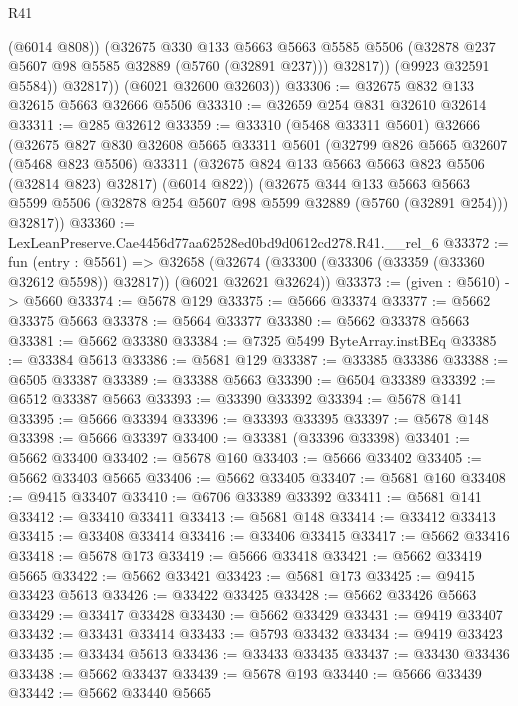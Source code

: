 \begin{lexlean}{R41}
\begin{coremodule}
                (@6014 @808))
              (@32675
                @330
                @133
                @5663
                @5663
                @5585
                @5506
                (@32878 @237 @5607 @98 @5585 @32889 (@5760 (@32891 @237)))
                @32817))
            (@9923 @32591 @5584))
          @32817))
      (@6021 @32600 @32603))
@33306 := @32675 @832 @133 @32615 @5663 @32666 @5506
@33310 := @32659 @254 @831 @32610 @32614
@33311 := @285 @32612
@33359 := @33310
    (@5468 @33311 @5601)
    @32666
    (@32675
      @827
      @830
      @32608
      @5665
      @33311
      @5601
      (@32799
        @826
        @5665
        @32607
        (@5468 @823 @5506)
        @33311
        (@32675 @824 @133 @5663 @5663 @823 @5506 (@32814 @823) @32817)
        (@6014 @822))
      (@32675
        @344
        @133
        @5663
        @5663
        @5599
        @5506
        (@32878 @254 @5607 @98 @5599 @32889 (@5760 (@32891 @254)))
        @32817))
@33360 := LexLeanPreserve.Cae4456d77aa62528ed0bd9d0612cd278.R41.__rel_6
@33372 := fun (entry : @5561) =>
  @32658 (@32674 (@33300 (@33306 (@33359 (@33360 @32612 @5598)) @32817)) (@6021 @32621 @32624))
@33373 := (given : @5610) -> @5660
@33374 := @5678 @129
@33375 := @5666 @33374
@33377 := @5662 @33375 @5663
@33378 := @5664 @33377
@33380 := @5662 @33378 @5663
@33381 := @5662 @33380
@33384 := @7325 @5499 ByteArray.instBEq
@33385 := @33384 @5613
@33386 := @5681 @129
@33387 := @33385 @33386
@33388 := @6505 @33387
@33389 := @33388 @5663
@33390 := @6504 @33389
@33392 := @6512 @33387 @5663
@33393 := @33390 @33392
@33394 := @5678 @141
@33395 := @5666 @33394
@33396 := @33393 @33395
@33397 := @5678 @148
@33398 := @5666 @33397
@33400 := @33381 (@33396 @33398)
@33401 := @5662 @33400
@33402 := @5678 @160
@33403 := @5666 @33402
@33405 := @5662 @33403 @5665
@33406 := @5662 @33405
@33407 := @5681 @160
@33408 := @9415 @33407
@33410 := @6706 @33389 @33392
@33411 := @5681 @141
@33412 := @33410 @33411
@33413 := @5681 @148
@33414 := @33412 @33413
@33415 := @33408 @33414
@33416 := @33406 @33415
@33417 := @5662 @33416
@33418 := @5678 @173
@33419 := @5666 @33418
@33421 := @5662 @33419 @5665
@33422 := @5662 @33421
@33423 := @5681 @173
@33425 := @9415 @33423 @5613
@33426 := @33422 @33425
@33428 := @5662 @33426 @5663
@33429 := @33417 @33428
@33430 := @5662 @33429
@33431 := @9419 @33407
@33432 := @33431 @33414
@33433 := @5793 @33432
@33434 := @9419 @33423
@33435 := @33434 @5613
@33436 := @33433 @33435
@33437 := @33430 @33436
@33438 := @5662 @33437
@33439 := @5678 @193
@33440 := @5666 @33439
@33442 := @5662 @33440 @5665

\end{coremodule}
\end{lexlean}

